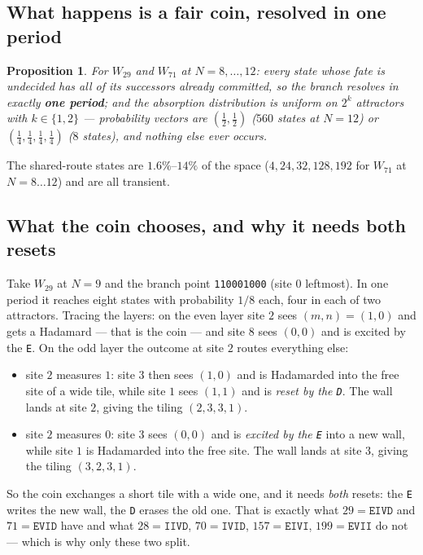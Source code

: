 \documentclass[11pt]{article}
\newcommand{\rt}[1]{\texttt{#1}}
\theoremstyle{plain}
\newtheorem{proposition}{Proposition}
\begin{document}
\subsection{What happens is a fair coin, resolved in one period}

\begin{proposition}
For $W_{29}$ and $W_{71}$ at $N=8,\dots,12$: every state whose fate is undecided
has \emph{all} of its successors already committed, so the branch resolves in
exactly \textbf{one period}; and the absorption distribution is uniform on $2^k$
attractors with $k\in\{1,2\}$ --- probability vectors are $(\tfrac12,\tfrac12)$
($560$ states at $N=12$) or $(\tfrac14,\tfrac14,\tfrac14,\tfrac14)$ ($8$ states),
and nothing else ever occurs.
\end{proposition}

\noindent The shared-route states are $1.6\%$--$14\%$ of the space
($4,24,32,128,192$ for $W_{71}$ at $N=8\ldots12$) and are all transient.

\subsection{What the coin chooses, and why it needs both resets}

Take $W_{29}$ at $N=9$ and the branch point \rt{110001000} (site $0$ leftmost).
In one period it reaches eight states with probability $1/8$ each, four in each
of two attractors. Tracing the layers: on the even layer site $2$ sees
$(m,n)=(1,0)$ and gets a Hadamard --- that is the coin --- and site $8$ sees
$(0,0)$ and is excited by the \rt{E}. On the odd layer the outcome at site $2$
routes everything else:
\begin{itemize}
\item site $2$ measures $1$: site $3$ then sees $(1,0)$ and is Hadamarded into
the free site of a wide tile, while site $1$ sees $(1,1)$ and is \emph{reset by
the \rt{D}}. The wall lands at site $2$, giving the tiling $(2,3,3,1)$.
\item site $2$ measures $0$: site $3$ sees $(0,0)$ and is \emph{excited by the
\rt{E}} into a new wall, while site $1$ is Hadamarded into the free site. The
wall lands at site $3$, giving the tiling $(3,2,3,1)$.
\end{itemize}
So the coin exchanges a short tile with a wide one, and it needs \emph{both}
resets: the
\rt{E} writes the new wall, the \rt{D} erases the old one. That is exactly what
$29=\rt{EIVD}$ and $71=\rt{EVID}$ have and what $28=\rt{IIVD}$, $70=\rt{IVID}$,
$157=\rt{EIVI}$, $199=\rt{EVII}$ do not --- which is why only these two split.
\end{document}
